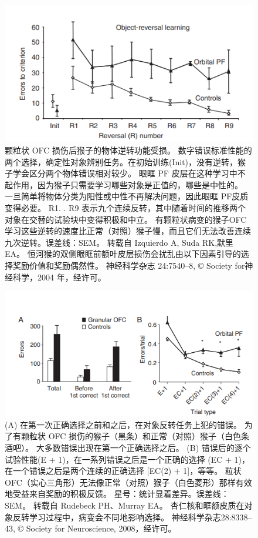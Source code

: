 \begin{figure}[!htb]
	\centering
	\includegraphics{image_pfc/Fig_4_7}
	\caption{颗粒状 OFC 损伤后猴子的物体逆转功能受损。 数字错误标准性能的两个选择，确定性对象辨别任务。在初始训练(Init)，没有逆转，猴子学会区分两个物体错误相对较少。 眼眶 PF 皮层在这种学习中不起作用，因为猴子只需要学习哪些对象是正值的，哪些是中性的。 一旦简单将物体分类为阳性或中性不再解决问题，因此眼眶 PF皮质变得必要。 R1. . R9 表示九个连续反转，其中随着时间的推移两个对象在交替的试验块中变得积极和中立。 有颗粒状病变的猴子OFC 学习这些逆转的速度比正常（对照）猴子慢，而且它们无法改善连续九次逆转。误差线：SEM。 转载自 Izquierdo A, Suda RK,默里EA。 恒河猴的双侧眼眶前额叶皮层损伤会扰乱由以下因素引导的选择奖励价值和奖励偶然性。 神经科学杂志 24:7540–8, © Society for神经科学，2004 年，经许可。}
	\label{fig:fig_4_7}
\end{figure}
\begin{figure}[!htb]
	\centering
	\includegraphics{image_pfc/Fig_4_8}
	\caption{(A) 在第一次正确选择之前和之后，在对象反转任务上犯的错误。 为了有颗粒状 OFC 损伤的猴子（黑条）和正常（对照）猴子（白色条酒吧）。 大多数错误出现在第一个正确选择之后。 (B) 错误后的逐个试验性能(E + 1)，在一系列错误之后是一个正确的选择 (EC + 1)，在一个错误之后是两个连续的正确选择 [EC(2) + 1]，等等。 粒状OFC（实心三角形）无法像正常（对照）猴子（白色菱形）那样有效地受益来自奖励的积极反馈。 星号：统计显着差异。误差线：SEM。 转载自 Rudebeck PH、Murray EA。 杏仁核和眶额皮质在对象反转学习过程中，病变会不同地影响选择。 神经科学杂志28:8338–43, © Society for Neuroscience, 2008，经许可。}
	\label{fig:fig_4_8}
\end{figure}
